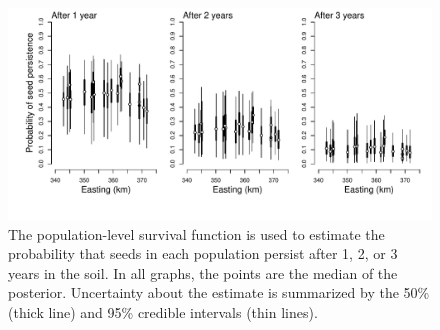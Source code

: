 \documentclass[12pt, oneside]{article}   	%
\begin{document}
 \begin{figure}[!h]
   \centering
       \includegraphics[page=1,width=1\textwidth]{../../figures/survival-function-summary.pdf}  
    \caption{ The population-level survival function is used to estimate the probability that seeds in each population persist after 1, 2, or 3 years in the soil. In all graphs, the points are the median of the posterior. Uncertainty about the estimate is summarized by the 50\% (thick line) and 95\% credible intervals (thin lines). }
 \label{fig:viability-estimates-population}
\end{figure}
\end{document}
